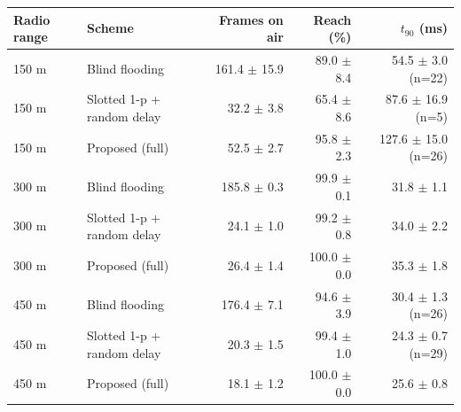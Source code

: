 \scriptsize
\renewcommand{\arraystretch}{1.2}
\begin{tabular}{llrrr}
\toprule
Radio range & Scheme & Frames on air & Reach (\%) & $t_{90}$ (ms) \\
\midrule
150 m & Blind flooding & 161.4 $\pm$ 15.9 & 89.0 $\pm$ 8.4 & 54.5 $\pm$ 3.0 (n=22) \\
150 m & Slotted 1-p + random delay & 32.2 $\pm$ 3.8 & 65.4 $\pm$ 8.6 & 87.6 $\pm$ 16.9 (n=5) \\
150 m & Proposed (full) & 52.5 $\pm$ 2.7 & 95.8 $\pm$ 2.3 & 127.6 $\pm$ 15.0 (n=26) \\
300 m & Blind flooding & 185.8 $\pm$ 0.3 & 99.9 $\pm$ 0.1 & 31.8 $\pm$ 1.1 \\
300 m & Slotted 1-p + random delay & 24.1 $\pm$ 1.0 & 99.2 $\pm$ 0.8 & 34.0 $\pm$ 2.2 \\
300 m & Proposed (full) & 26.4 $\pm$ 1.4 & 100.0 $\pm$ 0.0 & 35.3 $\pm$ 1.8 \\
450 m & Blind flooding & 176.4 $\pm$ 7.1 & 94.6 $\pm$ 3.9 & 30.4 $\pm$ 1.3 (n=26) \\
450 m & Slotted 1-p + random delay & 20.3 $\pm$ 1.5 & 99.4 $\pm$ 1.0 & 24.3 $\pm$ 0.7 (n=29) \\
450 m & Proposed (full) & 18.1 $\pm$ 1.2 & 100.0 $\pm$ 0.0 & 25.6 $\pm$ 0.8 \\
\bottomrule
\end{tabular}
